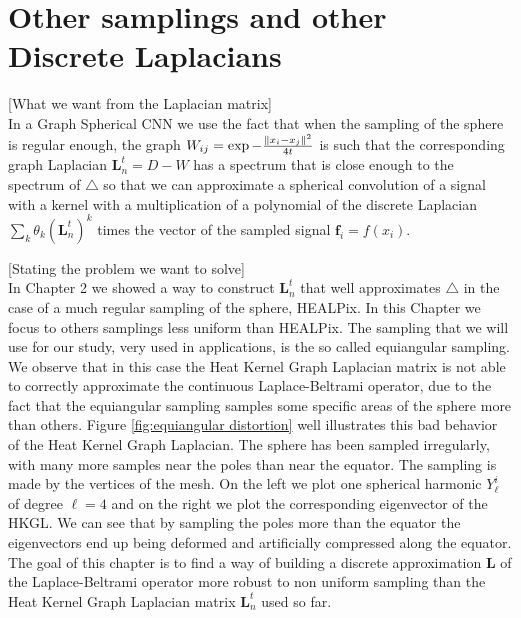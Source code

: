 

\section{Other samplings and other Discrete Laplacians}

[What we want from the Laplacian matrix]\\
In a Graph Spherical CNN we use the fact that when the sampling of the sphere is regular enough, the graph $W_{i j} = \exp {-\frac{\left\lVert x_i-x_j\right\rVert^2}{4t}}$ is such that the corresponding graph Laplacian $\mathbf L_n^t=D-W$ has a spectrum that is close enough to the spectrum of $\triangle$ so that we can approximate a spherical convolution of a signal with a kernel with a multiplication of a polynomial of the discrete Laplacian $\sum_k \theta_k (\mathbf L_n^t)^k$ times the vector of the sampled signal $\mathbf f_i = f(x_i)$. 

[Stating the problem we want to solve]\\
In Chapter 2 we showed a way to construct $\mathbf L_n^t$ that well approximates $\triangle$ in the case of a much regular sampling of the sphere, HEALPix. In this Chapter we focus to others samplings less uniform than HEALPix. The sampling that we will use for our study, very used in applications, is the so called equiangular sampling. We observe that in this case the Heat Kernel Graph Laplacian matrix is not able to correctly approximate the continuous Laplace-Beltrami operator, due to the fact that the equiangular sampling samples some specific areas of the sphere more than others. Figure \ref{fig:equiangular distortion} well illustrates this bad behavior of the Heat Kernel Graph Laplacian. The sphere has been sampled irregularly, with many more samples near the poles than near the equator. The sampling is made by the vertices of the mesh. On the left we plot one spherical harmonic $Y_\ell^i$ of degree $\ell=4$ and on the right we plot the corresponding eigenvector of the HKGL. We can see that by sampling the poles more than the equator the eigenvectors end up being deformed and artificially compressed along the equator. The goal of this chapter is to find a way of building a discrete approximation $\mathbf L$ of the Laplace-Beltrami operator more robust to non uniform sampling than the Heat Kernel Graph Laplacian matrix $\mathbf L_n^t$ used so far.

